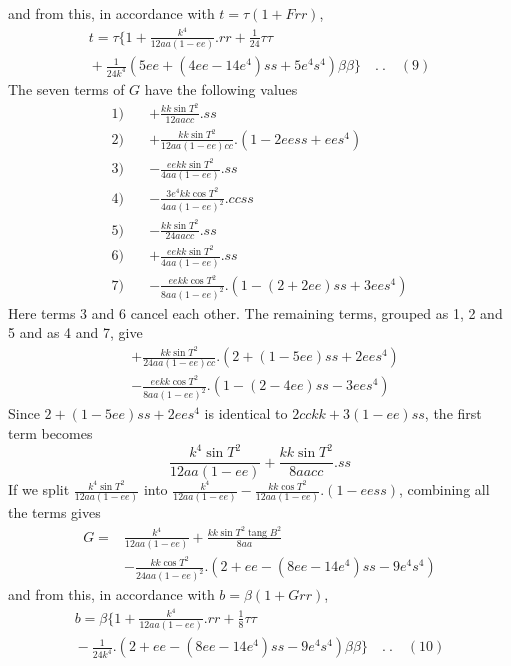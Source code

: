 %
and from this, in accordance with \(t=\tau(1+Frr)\),
\[
\begin{aligned}
t=\tau\{1+\frac{k^4}{12aa(1-ee)}\mathord{.}rr+\tfrac1{24}\tau\tau\\
{}+\frac1{24k^4}(5ee+(4ee-14e^4)ss+5e^4s^4)\beta\beta\}\quad .\ .\quad(9)
\end{aligned}
\]
The seven terms of \(G\) have the following values
\[
\begin{aligned}
1)\quad&+\frac{kk\sin T^2}{12aacc}\mathord{.}ss\\
2)\quad&+\frac{kk\sin T^2}{12aa(1-ee)cc}\mathord{.}(1-2eess+ees^4)\\
3)\quad&-\frac{eekk\sin T^2}{4aa(1-ee)}\mathord{.}ss\\
4)\quad&-\frac{3e^4kk\cos T^2}{4aa(1-ee)^2}\mathord{.}ccss\\
5)\quad&-\frac{kk\sin T^2}{24aacc}\mathord{.}ss\\
6)\quad&+\frac{eekk\sin T^2}{4aa(1-ee)}\mathord{.}ss\\
7)\quad&-\frac{eekk\cos T^2}{8aa(1-ee)^2}\mathord{.}(1-(2+2ee)ss+3ees^4)
\end{aligned}
\]
Here terms 3 and 6 cancel each other. The remaining terms, grouped as 1, 2 and 5 and as 4 and 7, give
\[
\begin{aligned}
&+\frac{kk\sin T^2}{24aa(1-ee)cc}\mathord{.}(2+(1-5ee)ss+2ees^4)\\
&-\frac{eekk\cos T^2}{8aa(1-ee)^2}\mathord{.}(1-(2-4ee)ss-3ees^4)
\end{aligned}
\]
Since \(2+(1-5ee)ss+2ees^4\) is identical to \(2cckk+3(1-ee)ss\), the first term becomes
\[
\frac{k^4\sin T^2}{12aa(1-ee)}+\frac{kk\sin T^2}{8aacc}\mathord{.}ss
\]
If we split \(\frac{k^4\sin T^2}{12aa(1-ee)}\) into \(\frac{k^4}{12aa(1-ee)}-\frac{kk\cos T^2}{12aa(1-ee)}\mathord{.}(1-eess)\), combining all the terms gives
\[
\begin{aligned}
G={}&\frac{k^4}{12aa(1-ee)}+\frac{kk\sin T^2\operatorname{tang}B^2}{8aa}\\
&-\frac{kk\cos T^2}{24aa(1-ee)^2}\mathord{.}(2+ee-(8ee-14e^4)ss-9e^4s^4)
\end{aligned}
\]
and from this, in accordance with \(b=\beta(1+Grr)\),
\[
\begin{aligned}
b=\beta\{1+\frac{k^4}{12aa(1-ee)}\mathord{.}rr+\tfrac18\tau\tau\\
{}-\frac1{24k^4}\mathord{.}(2+ee-(8ee-14e^4)ss-9e^4s^4)\beta\beta\}\quad .\ .\quad(10)
\end{aligned}
\]
